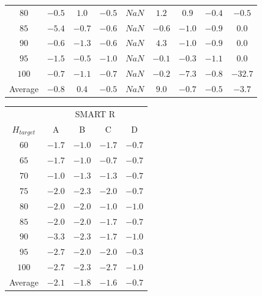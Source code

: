 \begin{table}[!t]
\begin{tabular}{c|cccc|cccc}
    $80$ & $-0.5$ & $1.0$ & $-0.5$ & $NaN$ & $1.2$ & $0.9$ & $-0.4$ & $-0.5$ \\
    $85$ & $-5.4$ & $-0.7$ & $-0.6$ & $NaN$ & $-0.6$ & $-1.0$ & $-0.9$ & $0.0$ \\
    $90$ & $-0.6$ & $-1.3$ & $-0.6$ & $NaN$ & $4.3$ & $-1.0$ & $-0.9$ & $0.0$ \\
    $95$ & $-1.5$ & $-0.5$ & $-1.0$ & $NaN$ & $-0.1$ & $-0.3$ & $-1.1$ & $0.0$ \\
    $100$ & $-0.7$ & $-1.1$ & $-0.7$ & $NaN$ & $-0.2$ & $-7.3$ & $-0.8$ & $-32.7$ \\
    \midrule
    Average & $-0.8$ & $0.4$ & $-0.5$ & $NaN$ & $9.0$ & $-0.7$ & $-0.5$ & $-3.7$ \\
    \bottomrule
  \end{tabular}
  \begin{tabular}{c|cccc}
    \toprule
    &\multicolumn{4}{c}{SMART R} \\
    $H_{target}$ & A & B & C & D \\
    \midrule
    $60$ & $-1.7$ & $-1.0$ & $-1.7$ & $-0.7$ \\
    $65$ & $-1.7$ & $-1.0$ & $-0.7$ & $-0.7$ \\
    $70$ & $-1.0$ & $-1.3$ & $-1.3$ & $-0.7$ \\
    $75$ & $-2.0$ & $-2.3$ & $-2.0$ & $-0.7$ \\
    $80$ & $-2.0$ & $-2.0$ & $-1.0$ & $-1.0$ \\
    $85$ & $-2.0$ & $-2.0$ & $-1.7$ & $-0.7$ \\
    $90$ & $-3.3$ & $-2.3$ & $-1.7$ & $-1.0$ \\
    $95$ & $-2.7$ & $-2.0$ & $-2.0$ & $-0.3$ \\
    $100$ & $-2.7$ & $-2.3$ & $-2.7$ & $-1.0$ \\
    \midrule
    Average & $-2.1$ & $-1.8$ & $-1.6$ & $-0.7$ \\
    \bottomrule
  \end{tabular}
  \label{tab:result}
\end{table}

